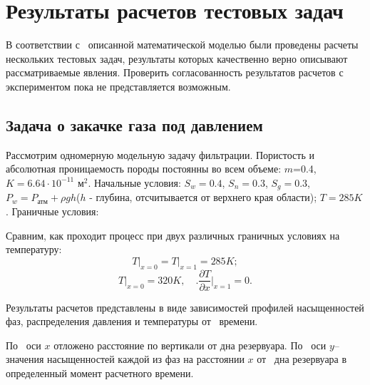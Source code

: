 %
\section{Результаты расчетов тестовых задач}
%
В соответствии с~ описанной математической моделью были проведены расчеты
нескольких тестовых задач, результаты которых качественно верно описывают
рассматриваемые явления. Проверить согласованность результатов расчетов с~
экспериментом пока не представляется возможным.

\subsection{Задача о закачке газа под давлением}
Рассмотрим одномерную модельную задачу фильтрации. Пористость и
абсолютная проницаемость породы постоянны во всем объеме:  $m$=0.4,\; $K=6.64\cdot 10^{-11}$ м$^2$.
Начальные условия:\; $S_w=0.4$,\; $S_n=0.3$,\; $S_g=0.3$, 
$P_w=P_\text{атм}+\rho g h$($h$ - глубина, отсчитывается от верхнего края области);
$T=285K$. Граничные условия:

Сравним, как проходит процесс при двух различных граничных
условиях на температуру:
\begin{equation} \label{noT} \left.T\right|_{x=0}=\left.T\right|_{x=1}=285K; \end{equation}
\begin{equation} \label{T} \left.T\right|_{x=0}=320K,\quad \Biggl.\dfrac{\partial{T}}{\partial{x}}\Biggr|_{x=1}=0. \end{equation}

Результаты расчетов представлены в виде зависимостей профилей насыщенностей фаз,
распределения давления и температуры от~ времени.

По~ оси $x$ отложено расстояние по вертикали от дна резервуара. По~ оси $y$--
значения насыщенностей каждой из фаз на расстоянии $x$ от~ дна резервуара
в~ определенный момент расчетного времени.

